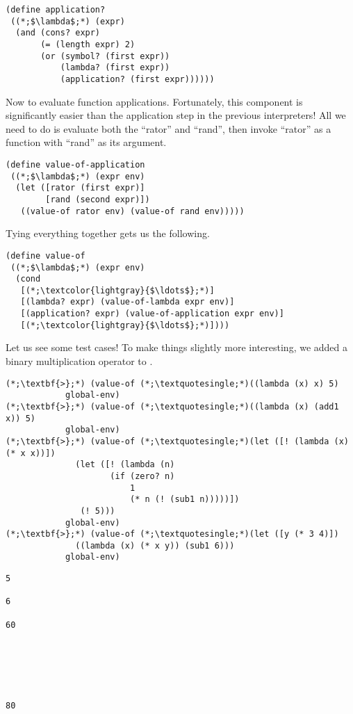 \begin{cl}[]{}\begin{lstlisting}[language=MyScheme]
(define application?
 ((*;$\lambda$;*) (expr)
  (and (cons? expr)
       (= (length expr) 2)
       (or (symbol? (first expr))
           (lambda? (first expr))
           (application? (first expr))))))
\end{lstlisting}\end{cl}

Now to evaluate function applications. Fortunately, this component is significantly easier than the application step in the previous interpreters! All we need to do is evaluate both the ``rator'' and ``rand'', then invoke ``rator'' as a function with ``rand'' as its argument.

\begin{cl}[]{}\begin{lstlisting}[language=MyScheme]
(define value-of-application
 ((*;$\lambda$;*) (expr env)
  (let ([rator (first expr)]
        [rand (second expr)])
   ((value-of rator env) (value-of rand env)))))
\end{lstlisting}\end{cl}

\noindent Tying everything together gets us the following.

\begin{cl}[]{}\begin{lstlisting}[language=MyScheme]
(define value-of
 ((*;$\lambda$;*) (expr env)
  (cond
   [(*;\textcolor{lightgray}{$\ldots$};*)]
   [(lambda? expr) (value-of-lambda expr env)]
   [(application? expr) (value-of-application expr env)]
   [(*;\textcolor{lightgray}{$\ldots$};*)])))
\end{lstlisting}\end{cl}

Let us see some test cases! To make things slightly more interesting, we added a binary multiplication operator to .

\begin{clo}[]{}
\begin{lstlisting}[language=MyNLNSOutput]
(*;\textbf{>};*) (value-of (*;\textquotesingle;*)((lambda (x) x) 5) 
            global-env)
(*;\textbf{>};*) (value-of (*;\textquotesingle;*)((lambda (x) (add1 x)) 5) 
            global-env)
(*;\textbf{>};*) (value-of (*;\textquotesingle;*)(let ([! (lambda (x) (* x x))])
              (let ([! (lambda (n)
                     (if (zero? n) 
                         1 
                         (* n (! (sub1 n)))))])
               (! 5))) 
            global-env)
(*;\textbf{>};*) (value-of (*;\textquotesingle;*)(let ([y (* 3 4)])
              ((lambda (x) (* x y)) (sub1 6)))
            global-env)
\end{lstlisting}
\tcblower
\begin{lstlisting}[language=MyOutput]
5

6

60






80
\end{lstlisting}
\end{clo}

